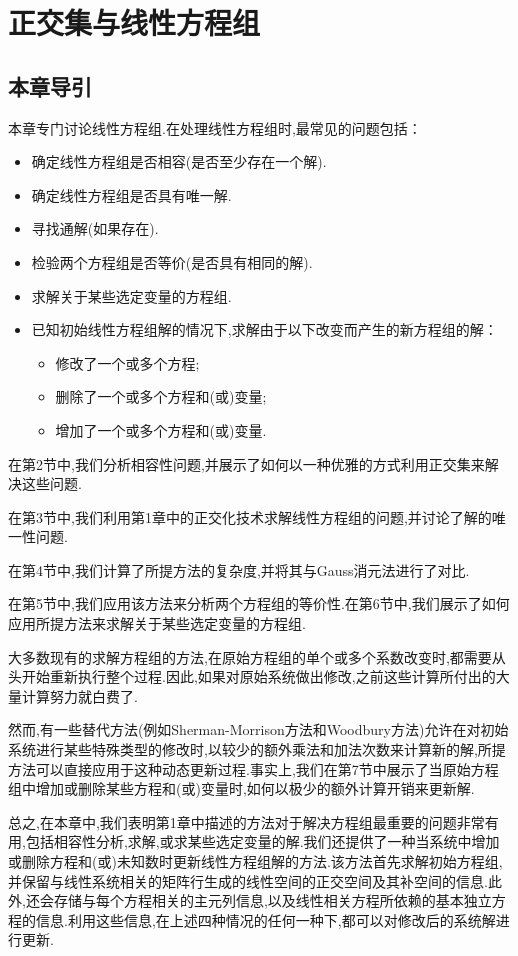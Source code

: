 \chapter{正交集与线性方程组}

\section{本章导引}

本章专门讨论线性方程组.在处理线性方程组时,最常见的问题包括：
\begin{itemize}
	\item 确定线性方程组是否相容(是否至少存在一个解).
	\item 确定线性方程组是否具有唯一解.
	\item 寻找通解(如果存在).
	\item 检验两个方程组是否等价(是否具有相同的解).
	\item 求解关于某些选定变量的方程组.
	\item 已知初始线性方程组解的情况下,求解由于以下改变而产生的新方程组的解：
	\begin{itemize}
		\item 修改了一个或多个方程;
		\item 删除了一个或多个方程和(或)变量;
		\item 增加了一个或多个方程和(或)变量.
	\end{itemize}
\end{itemize}

在第2节中,我们分析相容性问题,并展示了如何以一种优雅的方式利用正交集来解决这些问题.

在第3节中,我们利用第1章中的正交化技术求解线性方程组的问题,并讨论了解的唯一性问题.

在第4节中,我们计算了所提方法的复杂度,并将其与Gauss消元法进行了对比.

在第5节中,我们应用该方法来分析两个方程组的等价性.在第6节中,我们展示了如何应用所提方法来求解关于某些选定变量的方程组.

大多数现有的求解方程组的方法,在原始方程组的单个或多个系数改变时,都需要从头开始重新执行整个过程.因此,如果对原始系统做出修改,之前这些计算所付出的大量计算努力就白费了.

然而,有一些替代方法(例如Sherman-Morrison方法和Woodbury方法)允许在对初始系统进行某些特殊类型的修改时,以较少的额外乘法和加法次数来计算新的解,所提方法可以直接应用于这种动态更新过程.事实上,我们在第7节中展示了当原始方程组中增加或删除某些方程和(或)变量时,如何以极少的额外计算开销来更新解.

总之,在本章中,我们表明第1章中描述的方法对于解决方程组最重要的问题非常有用,包括相容性分析,求解,或求某些选定变量的解.我们还提供了一种当系统中增加或删除方程和(或)未知数时更新线性方程组解的方法.该方法首先求解初始方程组,并保留与线性系统相关的矩阵行生成的线性空间的正交空间及其补空间的信息.此外,还会存储与每个方程相关的主元列信息,以及线性相关方程所依赖的基本独立方程的信息.利用这些信息,在上述四种情况的任何一种下,都可以对修改后的系统解进行更新.